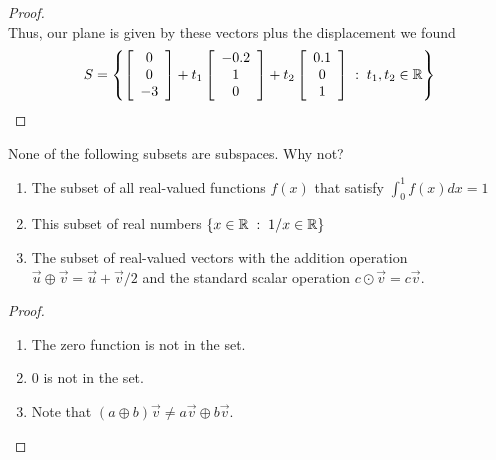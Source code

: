 \documentclass{tutorial}
\begin{document}
\begin{proof}
\[\]
Thus, our plane is given by these vectors plus the displacement we found
\[
  S = \left\{ 
        \left[ \begin{array}{c}    0 \\ 0 \\ -3 \end{array} \right]
  + t_1 \left[ \begin{array}{c} -0.2 \\ 1 \\  0 \end{array} \right]
  + t_2 \left[ \begin{array}{c}  0.1 \\ 0 \\  1 \end{array} \right]
  \; : \; t_1, t_2 \in \mathbb{R}
  \right\}
\]
\end{proof}\else \vspace{1in} \fi



\begin{prob}[Subspaces]
None of the following subsets are subspaces. Why not?
\begin{enumerate}[label=(\alph*)]
\item The subset of all real-valued functions $f(x)$ that satisfy $\int_0^1 f(x) dx = 1$
\item This subset of real numbers $\left\{ x \in \mathbb{R} \; : \; 1/x \in \mathbb{R} \right\}$
\item The subset of real-valued vectors with the addition operation $\vec{u} \oplus \vec{v} = \vec{u}+\vec{v}/2$ and the standard scalar operation $c \odot \vec{v} = c \vec{v}$.
\end{enumerate} 
\end{prob} \ifsolns \begin{proof} \mbox{}
\begin{enumerate}[label=(\alph*)]
\item The zero function is not in the set.
\item $0$ is not in the set.
\item Note that $(a \oplus b) \vec{v} \neq a \vec{v} \oplus b \vec{v}$.
\end{enumerate} 
\end{proof}\else \vspace{1in} \fi
\end{document}
